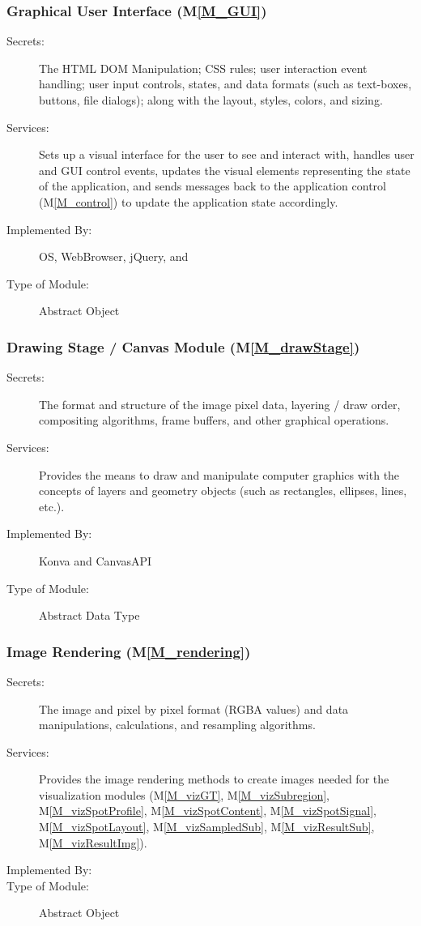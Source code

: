 \documentclass[12pt, titlepage]{article}
\newcommand{\mref}[1]{M\ref{#1}}
\begin{document}
\subsubsection{Graphical User Interface (\mref{M_GUI})}
\begin{description}
\item[Secrets:] The HTML DOM Manipulation; CSS rules; user interaction event handling;
  user input controls, states, and data formats (such as text-boxes, buttons, file dialogs);
  along with the layout, styles, colors, and sizing.
\item[Services:] Sets up a visual interface for the user to see and interact with,
  handles user and GUI control events, updates the visual elements representing the
  state of the application, and sends messages back to the
  application control (\mref{M_control})
  to update the application state accordingly.
\item[Implemented By:] OS, WebBrowser, jQuery, and \progname{}
\item[Type of Module:] Abstract Object
\end{description}


\subsubsection{Drawing Stage / Canvas Module (\mref{M_drawStage})}
\begin{description}
\item[Secrets:] The format and structure of the image pixel data, layering / draw order,
  compositing algorithms, frame buffers, and other graphical operations.
\item[Services:] Provides the means to draw and manipulate computer graphics with the
  concepts of layers and geometry objects (such as rectangles, ellipses, lines, etc.).
\item[Implemented By:] Konva and CanvasAPI
\item[Type of Module:] Abstract Data Type
\end{description}


\subsubsection{Image Rendering (\mref{M_rendering})}
\begin{description}
\item[Secrets:] The image and pixel by pixel format (RGBA values) and data manipulations,
  calculations, and resampling algorithms.
\item[Services:] Provides the image rendering methods to create images needed for
  the visualization modules (\mref{M_vizGT}, \mref{M_vizSubregion},
  \mref{M_vizSpotProfile}, \mref{M_vizSpotContent}, \mref{M_vizSpotSignal},
  \mref{M_vizSpotLayout}, \mref{M_vizSampledSub}, \mref{M_vizResultSub},
  \mref{M_vizResultImg}).
\item[Implemented By:] \progname{}
\item[Type of Module:] Abstract Object
\end{description}
\end{document}
